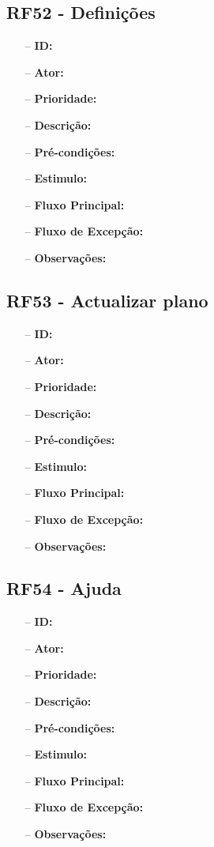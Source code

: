 \subsection{RF52 - Definições}
\begin{itemize}
	\item[--] \textbf{ID:} 
	\item[--]  \textbf{Ator:} 
	\item[--]  \textbf{Prioridade:} 
	\item[--]  \textbf{Descrição:} 
	\item[--]  \textbf{Pré-condições:} 
	\item[--]  \textbf{Estimulo:}
	\item[--]  \textbf{Fluxo Principal:} 
	\subitem
	\subitem
	\subitem
	\subitem
	\item[--]  \textbf{Fluxo de Excepção:} 
	\subitem
	\subitem
	\subitem
	\subitem
	\item[--]  \textbf{Observações:} 
\end{itemize}
\newpage

\subsection{RF53 - Actualizar plano}
\begin{itemize}
	\item[--] \textbf{ID:} 
	\item[--]  \textbf{Ator:} 
	\item[--]  \textbf{Prioridade:} 
	\item[--]  \textbf{Descrição:} 
	\item[--]  \textbf{Pré-condições:} 
	\item[--]  \textbf{Estimulo:}
	\item[--]  \textbf{Fluxo Principal:} 
	\subitem
	\subitem
	\subitem
	\subitem
	\item[--]  \textbf{Fluxo de Excepção:} 
	\subitem
	\subitem
	\subitem
	\subitem
	\item[--]  \textbf{Observações:} 
\end{itemize}
\newpage

\subsection{RF54 - Ajuda}
\begin{itemize}
	\item[--] \textbf{ID:} 
	\item[--]  \textbf{Ator:} 
	\item[--]  \textbf{Prioridade:} 
	\item[--]  \textbf{Descrição:} 
	\item[--]  \textbf{Pré-condições:} 
	\item[--]  \textbf{Estimulo:}
	\item[--]  \textbf{Fluxo Principal:} 
	\subitem
	\subitem
	\subitem
	\subitem
	\item[--]  \textbf{Fluxo de Excepção:} 
	\subitem
	\subitem
	\subitem
	\subitem
	\item[--]  \textbf{Observações:} 
\end{itemize}
\newpage

